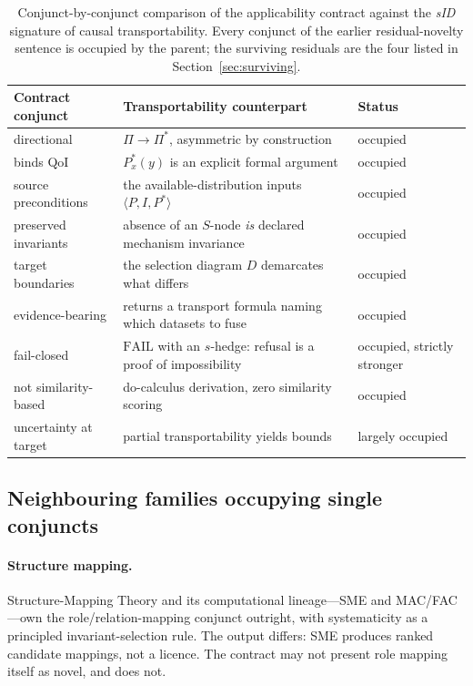 \begin{table}[t]
\footnotesize
\begin{tabularx}{\linewidth}{@{}lYl@{}}
\toprule
Contract conjunct & Transportability counterpart & Status \\
\midrule
directional & $\Pi\to\Pi^{\ast}$, asymmetric by construction & occupied \\
binds QoI & $P^{\ast}_{x}(y)$ is an explicit formal argument & occupied \\
source preconditions & the available-distribution inputs $\langle P,I,P^{\ast}\rangle$ & occupied \\
preserved invariants & absence of an $S$-node \emph{is} declared mechanism invariance & occupied \\
target boundaries & the selection diagram $D$ demarcates what differs & occupied \\
evidence-bearing & returns a transport formula naming which datasets to fuse & occupied \\
fail-closed & $\mathrm{FAIL}$ with an $s$-hedge: refusal is a proof of impossibility & occupied, strictly stronger \\
not similarity-based & do-calculus derivation, zero similarity scoring & occupied \\
uncertainty at target & partial transportability yields bounds & largely occupied \\
\bottomrule
\end{tabularx}
\caption{Conjunct-by-conjunct comparison of the applicability contract against the \textit{sID} signature of causal transportability. Every conjunct of the earlier residual-novelty sentence is occupied by the parent; the surviving residuals are the four listed in Section~\ref{sec:surviving}.}
\label{tab:conjuncts}
\end{table}

\subsection{Neighbouring families occupying single conjuncts}

\paragraph{Structure mapping.} Structure-Mapping Theory and its computational lineage---SME and MAC/FAC \cite{gentner1983structure,falkenhainer1989sme,forbus1995macfac}---own the role/relation-mapping conjunct outright, with systematicity as a principled invariant-selection rule. The output differs: SME produces ranked candidate mappings, not a licence. The contract may not present role mapping itself as novel, and does not.

